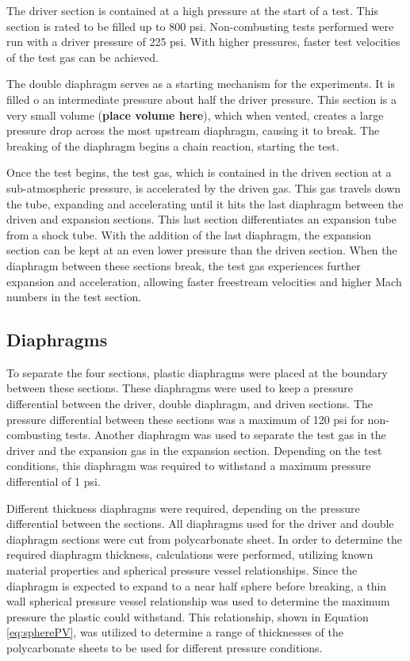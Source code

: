 The driver section is contained at a high pressure at the start of a test. This section is rated to be filled up to 800 psi. Non-combusting tests performed were run with a driver pressure of 225 psi. With higher pressures, faster test velocities of the test gas can be achieved. 

The double diaphragm serves as a starting mechanism for the experiments. It is filled o an intermediate pressure about half the driver pressure. This section is a very small volume (\textbf{place volume here}), which when vented, creates a large pressure drop across the most upstream diaphragm, causing it to break. The breaking of the diaphragm begins a chain reaction, starting the test. 

Once the test begins, the test gas, which is contained in the driven section at a sub-atmospheric pressure, is accelerated by the driven gas. This gas travels down the tube, expanding and accelerating until it hits the last diaphragm between the driven and expansion sections. This last section differentiates an expansion tube from a shock tube. With the addition of the last diaphragm, the expansion section can be kept at an even lower pressure than the driven section. When the diaphragm between these sections break, the test gas experiences further expansion and acceleration, allowing faster freestream velocities and higher Mach numbers in the test section. 


\subsection{Diaphragms}
To separate the four sections, plastic diaphragms were placed at the boundary between these sections. These diaphragms were used to keep a pressure differential between the driver, double diaphragm, and driven sections. The pressure differential between these sections was a maximum of 120 psi for non-combusting tests. Another diaphragm was used to separate the test gas in the driver and the expansion gas in the expansion section. Depending on the test conditions, this diaphragm was required to withstand a maximum pressure differential of 1 psi. 

Different thickness diaphragms were required, depending on the pressure differential between the sections. All diaphragms used for the driver and double diaphragm sections were cut from polycarbonate sheet. In order to determine the required diaphragm thickness, calculations were performed, utilizing known material properties and spherical pressure vessel relationships. Since the diaphragm is expected to expand to a near half sphere before breaking, a thin wall spherical pressure vessel relationship was used to determine the maximum pressure the plastic could withstand. This relationship, shown in Equation \ref{eq:spherePV}, was utilized to determine a range of thicknesses of the polycarbonate sheets to be used for different pressure conditions. 

